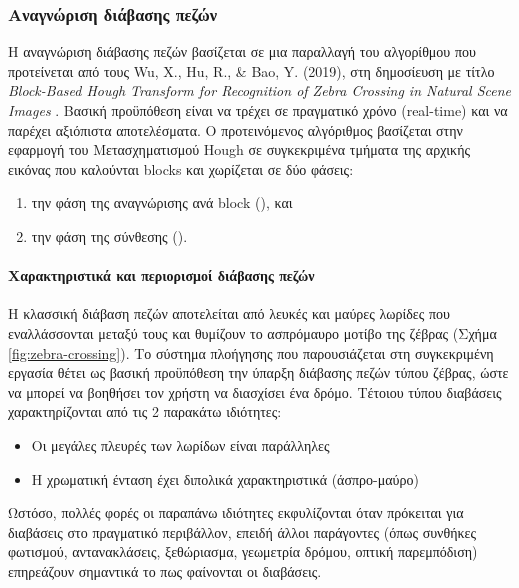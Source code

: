\subsubsection{Αναγνώριση διάβασης πεζών}
Η αναγνώριση διάβασης πεζών βασίζεται σε μια παραλλαγή του αλγορίθμου που προτείνεται από τους Wu, X., Hu, R., \& Bao, Y. (2019), στη δημοσίευση με τίτλο \emph{Block-Based Hough Transform for Recognition of Zebra Crossing in Natural Scene Images} \cite{wu_block-based_2019}. Βασική προϋπόθεση είναι να τρέχει σε πραγματικό χρόνο (real-time) και να παρέχει αξιόπιστα αποτελέσματα. Ο προτεινόμενος αλγόριθμος βασίζεται στην εφαρμογή του Μετασχηματισμού Hough σε συγκεκριμένα τμήματα της αρχικής εικόνας που καλούνται blocks και χωρίζεται σε δύο φάσεις:
\begin{enumerate}
    \item την φάση της αναγνώρισης ανά block (), και
    \item την φάση της σύνθεσης (). 
\end{enumerate}

\paragraph{Χαρακτηριστικά και περιορισμοί διάβασης πεζών}
Η κλασσική διάβαση πεζών αποτελείται από λευκές και μαύρες λωρίδες που εναλλάσσονται μεταξύ τους και θυμίζουν το ασπρόμαυρο μοτίβο της ζέβρας (Σχήμα \ref{fig:zebra-crossing}). Το σύστημα πλοήγησης που παρουσιάζεται στη συγκεκριμένη εργασία θέτει ως βασική προϋπόθεση την ύπαρξη διάβασης πεζών τύπου ζέβρας, ώστε να μπορεί να βοηθήσει τον χρήστη να διασχίσει ένα δρόμο. Τέτοιου τύπου διαβάσεις χαρακτηρίζονται από τις 2 παρακάτω ιδιότητες:
\begin{itemize}
    \item Οι μεγάλες πλευρές των λωρίδων είναι παράλληλες
    \item Η χρωματική ένταση έχει διπολικά χαρακτηριστικά (άσπρο-μαύρο)
\end{itemize}
Ωστόσο, πολλές φορές οι παραπάνω ιδιότητες εκφυλίζονται όταν πρόκειται για διαβάσεις στο πραγματικό περιβάλλον, επειδή άλλοι παράγοντες (όπως συνθήκες φωτισμού, αντανακλάσεις, ξεθώριασμα, γεωμετρία δρόμου, οπτική παρεμπόδιση) επηρεάζουν σημαντικά το πως φαίνονται οι διαβάσεις.

